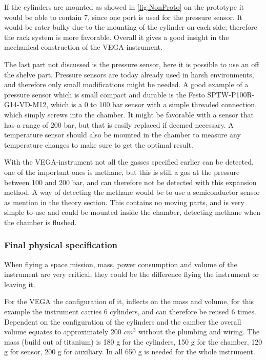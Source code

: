 If the cylinders are mounted as showed in \ref{fig:NonProto} on the prototype it would be able to contain 7, since one port is used for the pressure sensor. It would be rater bulky due to the mounting of the cylinder on each side; therefore the rack system is more favorable. Overall it gives a good insight in the mechanical construction of the VEGA-instrument.

The last part not discussed is the pressure sensor, here it is possible to use an off the shelve part. Pressure sensors are today already used in harsh environments, and therefore only small modifications might be needed. A good example of a pressure sensor which is small compact and durable is the Festo SPTW-P100R-G14-VD-M12, which is a 0 to 100 bar sensor with a simple threaded connection, which simply screws into the chamber. It might be favorable with a sensor that has a range of 200 bar, but that is easily replaced if deemed necessary. A temperature sensor should also be mounted in the chamber to measure any temperature changes to make sure to get the optimal result.

With the VEGA-instrument not all the gasses specified earlier can be detected, one of the important ones is methane, but this is still a gas at the pressure between 100 and 200 bar, and can therefore not be detected with this expansion method. A way of detecting the methane would be to use a semiconductor sensor as mention in the theory section. This contains no moving parts, and is very simple to use and could be mounted inside the chamber, detecting methane when the chamber is flushed.

\subsubsection{Final physical specification}

When flying a space mission, mass, power consumption and volume of the instrument are very critical, they could be the difference flying the instrument or leaving it.

For the VEGA the configuration of it, inflects on the mass and volume, for this example the instrument carries 6 cylinders, and can therefore be reused 6 times. Dependent on the configuration of the cylinders and the camber the overall volume equates to approximately 200 $cm^3$ without the plumbing and wiring. The mass (build out of titanium) is 180 g for the cylinders, 150 g for the chamber, 120 g for sensor, 200 g for auxiliary. In all 650 g is needed for the whole instrument.

